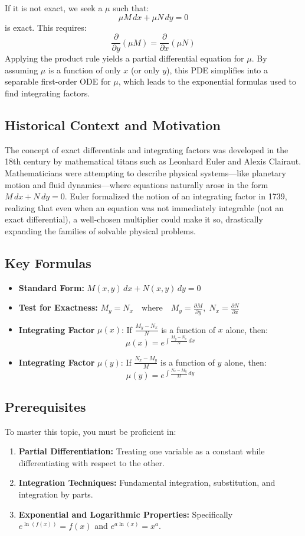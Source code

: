 \documentclass[11pt]{article}
\begin{document}
If it is not exact, we seek a $\mu$ such that:
\[ \mu M \, dx + \mu N \, dy = 0 \]
is exact. This requires:
\[ \frac{\partial}{\partial y} (\mu M) = \frac{\partial}{\partial x}(\mu N) \]
Applying the product rule yields a partial differential equation for $\mu$. By assuming $\mu$ is a function of only $x$ (or only $y$), this PDE simplifies into a separable first-order ODE for $\mu$, which leads to the exponential formulas used to find integrating factors.

\subsection*{Historical Context and Motivation}
The concept of exact differentials and integrating factors was developed in the 18th century by mathematical titans such as Leonhard Euler and Alexis Clairaut. Mathematicians were attempting to describe physical systems---like planetary motion and fluid dynamics---where equations naturally arose in the form $M \, dx + N \, dy = 0$. Euler formalized the notion of an integrating factor in 1739, realizing that even when an equation was not immediately integrable (not an exact differential), a well-chosen multiplier could make it so, drastically expanding the families of solvable physical problems.

\subsection*{Key Formulas}
\begin{itemize}
    \item \textbf{Standard Form:} $M(x, y) \, dx + N(x, y) \, dy = 0$
    \item \textbf{Test for Exactness:} $M_y = N_x \quad \text{where} \quad M_y = \frac{\partial M}{\partial y}, \; N_x = \frac{\partial N}{\partial x}$
    \item \textbf{Integrating Factor} $\mu(x)$: If $\frac{M_y - N_x}{N}$ is a function of $x$ alone, then:
    \[ \mu(x) = e^{\int \frac{M_y - N_x}{N} \, dx} \]
    \item \textbf{Integrating Factor} $\mu(y)$: If $\frac{N_x - M_y}{M}$ is a function of $y$ alone, then:
    \[ \mu(y) = e^{\int \frac{N_x - M_y}{M} \, dy} \]
\end{itemize}

\subsection*{Prerequisites}
To master this topic, you must be proficient in:
\begin{enumerate}
    \item \textbf{Partial Differentiation:} Treating one variable as a constant while differentiating with respect to the other.
    \item \textbf{Integration Techniques:} Fundamental integration, substitution, and integration by parts.
    \item \textbf{Exponential and Logarithmic Properties:} Specifically $e^{\ln(f(x))} = f(x)$ and $e^{a \ln(x)} = x^a$.
\end{enumerate}
\end{document}
